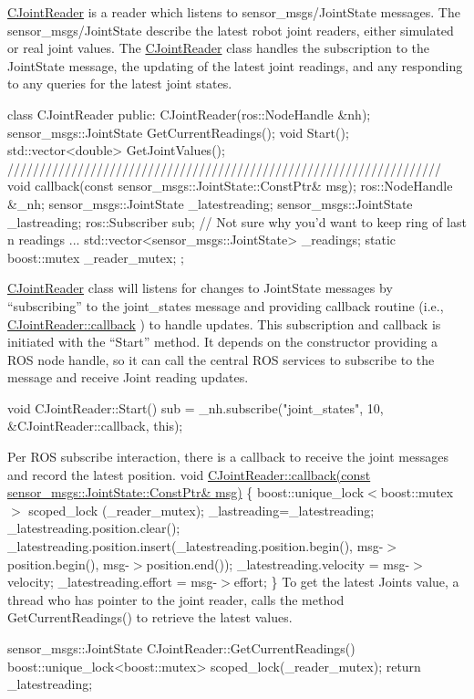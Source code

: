 \hyperlink{classCJointReader}{C\-Joint\-Reader} is a reader which listens to sensor\-\_\-msgs/\-Joint\-State messages. The sensor\-\_\-msgs/\-Joint\-State describe the latest robot joint readers, either simulated or real joint values. The \hyperlink{classCJointReader}{C\-Joint\-Reader} class handles the subscription to the Joint\-State message, the updating of the latest joint readings, and any responding to any queries for the latest joint states. \begin{DoxyVerb}class CJointReader {
public:
    CJointReader(ros::NodeHandle &nh);
    sensor_msgs::JointState GetCurrentReadings();
    void Start();
    std::vector<double> GetJointValues();
    ////////////////////////////////////////////////////////////////////
    void callback(const sensor_msgs::JointState::ConstPtr& msg);
    ros::NodeHandle &_nh;
    sensor_msgs::JointState _latestreading;
    sensor_msgs::JointState _lastreading;
    ros::Subscriber sub;
    // Not sure why you'd want to keep ring of last n readings ...
    std::vector<sensor_msgs::JointState> _readings;
    static boost::mutex _reader_mutex;
};
\end{DoxyVerb}


\hyperlink{classCJointReader}{C\-Joint\-Reader} class will listens for changes to Joint\-State messages by “subscribing” to the joint\-\_\-states message and providing callback routine (i.\-e., \hyperlink{classCJointReader_a88bd747fdc64aab2ce0843fdf1efc0af}{C\-Joint\-Reader\-::callback} ) to handle updates. This subscription and callback is initiated with the “\-Start” method. It depends on the constructor providing a R\-O\-S node handle, so it can call the central R\-O\-S services to subscribe to the message and receive Joint reading updates. \begin{DoxyVerb}void CJointReader::Start() {
    sub = _nh.subscribe("joint_states", 10, &CJointReader::callback, this);
}
\end{DoxyVerb}


Per R\-O\-S subscribe interaction, there is a callback to receive the joint messages and record the latest position. void \hyperlink{classCJointReader_a88bd747fdc64aab2ce0843fdf1efc0af}{C\-Joint\-Reader\-::callback(const sensor\-\_\-msgs\-::\-Joint\-State\-::\-Const\-Ptr\& msg)} \{ boost\-::unique\-\_\-lock$<$boost\-::mutex$>$ scoped\-\_\-lock (\-\_\-reader\-\_\-mutex); \-\_\-lastreading=\-\_\-latestreading; \-\_\-latestreading.\-position.\-clear(); \-\_\-latestreading.\-position.\-insert(\-\_\-latestreading.\-position.\-begin(), msg-\/$>$position.\-begin(), msg-\/$>$position.\-end()); \-\_\-latestreading.\-velocity = msg-\/$>$velocity; \-\_\-latestreading.\-effort = msg-\/$>$effort; \} To get the latest Joints value, a thread who has pointer to the joint reader, calls the method Get\-Current\-Readings() to retrieve the latest values. \begin{DoxyVerb}sensor_msgs::JointState CJointReader::GetCurrentReadings() {
    boost::unique_lock<boost::mutex> scoped_lock(_reader_mutex);
    return _latestreading;
} 
\end{DoxyVerb}


